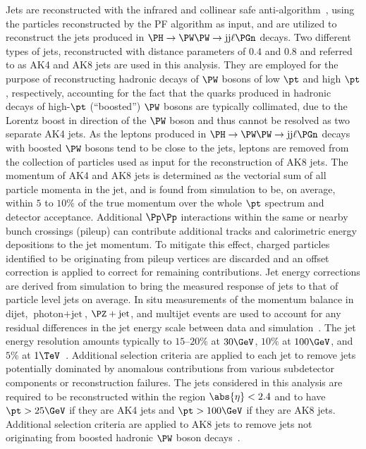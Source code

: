 Jets are reconstructed with the infrared and collinear safe anti-\kt algorithm~\cite{Cacciari:2008gp, Cacciari:2011ma},
using the particles reconstructed by the PF algorithm as input,
and are utilized to reconstruct the jets produced in $\PHiggs \to \PW\PW \to \jet\jet\Plepton\Pnu$ decays.
Two different types of jets, reconstructed with distance parameters of $0.4$ and $0.8$ and referred to as AK4 and AK8 jets are used in this analysis.
They are employed for the purpose of reconstructing hadronic decays of $\PW$ bosons of low $\pt$ and high $\pt$, respectively,
accounting for the fact that the quarks produced in hadronic decays of high-$\pt$ (``boosted'') $\PW$ bosons are typically collimated,
due to the Lorentz boost in direction of the $\PW$ boson and thus cannot be resolved as two separate AK4 jets.
As the leptons produced in $\PHiggs \to \PW\PW \to \jet\jet\Plepton\Pnu$ decays with boosted $\PW$ bosons tend to be close to the jets,
leptons are removed from the collection of particles used as input for the reconstruction of AK8 jets.
The momentum of AK4 and AK8 jets is determined as the vectorial sum of all particle momenta in the jet, 
and is found from simulation to be, on average, within $5$ to $10\%$ of the true momentum over the whole $\pt$ spectrum and detector acceptance.
Additional $\Pp\Pp$ interactions within the same or nearby bunch crossings (pileup) can contribute additional tracks and calorimetric energy depositions to the jet momentum. 
To mitigate this effect, charged particles identified to be originating from pileup vertices are discarded and an offset correction is applied to correct for remaining contributions. 
Jet energy corrections are derived from simulation to bring the measured response of jets to that of particle level jets on average. 
In situ measurements of the momentum balance in dijet, $\text{photon} + \text{jet}$, $\PZ + \text{jet}$, and multijet events 
are used to account for any residual differences in the jet energy scale between data and simulation~\cite{Khachatryan:2016kdb}. 
The jet energy resolution amounts typically to $15$--$20\%$ at $30\GeV$, $10\%$ at $100\GeV$, and $5\%$ at $1\TeV$~\cite{Khachatryan:2016kdb}. 
Additional selection criteria are applied to each jet to remove jets potentially dominated by anomalous contributions from various subdetector components or reconstruction failures.
The jets considered in this analysis are required to be reconstructed within the region $\abs{\eta} < 2.4$
and to have $\pt > 25\GeV$ if they are AK4 jets and $\pt > 100\GeV$ if they are AK8 jets.
Additional selection criteria are applied to AK8 jets to remove jets not originating from boosted hadronic $\PW$ boson decays~\cite{Sirunyan:2019quj}.

